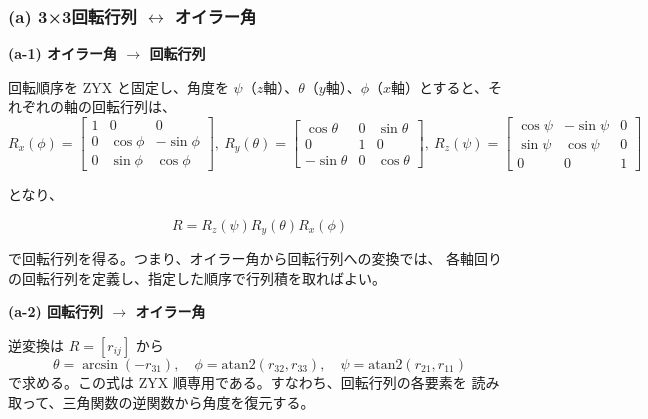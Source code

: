 ﻿\documentclass[11pt,a4paper]{ltjsarticle}
\begin{document}
\subsubsection*{(a) 3×3回転行列 $\leftrightarrow$ オイラー角}
\hspace*{2em}\textbf{(a-1) オイラー角 $\rightarrow$ 回転行列}

回転順序を ZYX と固定し、角度を $\psi$（$z$軸）、$\theta$（$y$軸）、$\phi$（$x$軸）とすると、それぞれの軸の回転行列は、
\[
R_x(\phi)=
\begin{bmatrix}
1&0&0\\
0&\cos\phi&-\sin\phi\\
0&\sin\phi&\cos\phi
\end{bmatrix},\ 
R_y(\theta)=
\begin{bmatrix}
\cos\theta&0&\sin\theta\\
0&1&0\\
-\sin\theta&0&\cos\theta
\end{bmatrix},\ 
R_z(\psi)=
\begin{bmatrix}
\cos\psi&-\sin\psi&0\\
\sin\psi&\cos\psi&0\\
0&0&1
\end{bmatrix}
\]

となり、

\[
R = R_z(\psi)R_y(\theta)R_x(\phi)
\]

で回転行列を得る。つまり、オイラー角から回転行列への変換では、
各軸回りの回転行列を定義し、指定した順序で行列積を取ればよい。

\hspace*{2em}\textbf{(a-2) 回転行列 $\rightarrow$ オイラー角}

逆変換は $R=[r_{ij}]$ から
\[
\theta = \arcsin(-r_{31}),\quad
\phi = \mathrm{atan2}(r_{32},r_{33}),\quad
\psi = \mathrm{atan2}(r_{21},r_{11})
\]
で求める。この式は ZYX 順専用である。すなわち、回転行列の各要素を
読み取って、三角関数の逆関数から角度を復元する。
\end{document}
